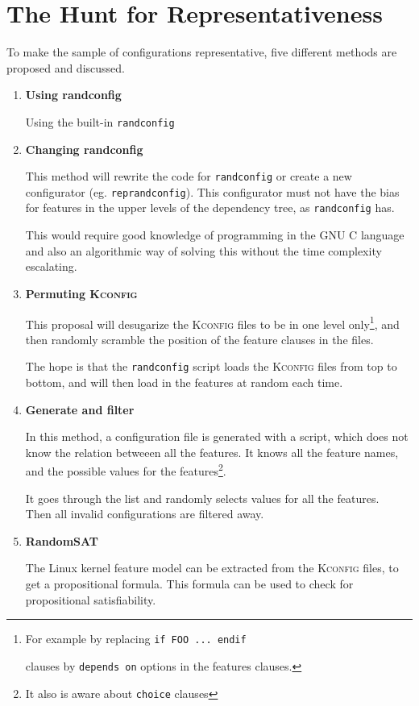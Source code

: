 \documentclass[a4paper,11pt]{report}
\newcommand{\f}{\footnote{\fn}}
\newcommand{\textcode}[1]{
    \fboxsep=1pt
    \texttt{\colorbox{gray!20}{#1}}
}
\begin{document}
        \section{The Hunt for Representativeness}
        \label{rephunt}
To make the sample of configurations representative, five different methods are
proposed and discussed.

\begin{enumerate}

    \item \textbf{Using randconfig}

Using the built-in \texttt{randconfig}

    \item \textbf{Changing randconfig}

This method will rewrite the code for \texttt{randconfig} or create a new 
configurator (eg. \texttt{reprandconfig}).  This configurator must not have the 
bias for features in the upper levels of the dependency tree, as 
\texttt{randconfig} has.

This would require good knowledge of programming in the \textsc{GNU C} language
and also an algorithmic way of solving this without the time complexity 
escalating.


    \item \textbf{Permuting \textsc{Kconfig}}

            \def \fn {For example by replacing \textcode{if FOO ... endif} 
            clauses by \textcode{depends on} options in the features clauses.}

This proposal will desugarize the \textsc{Kconfig} files to be in one level 
only\f, and then randomly scramble the position of the feature clauses in the 
files. 

The hope is that the \texttt{randconfig} script loads the \textsc{Kconfig} 
files from top to bottom, and will then load in the features at random each 
time.


    \item \textbf{Generate and filter}

            \def \fn {It also is aware about \texttt{choice} clauses}

In this method, a configuration file is generated with a script, which 
does not know the relation betweeen all the features. It knows all the feature
names, and the possible values for the features\f.

It goes through the list and randomly selects values for all the features. 
\\

Then all invalid configurations are filtered away.


    \item \textbf{RandomSAT}

The Linux kernel feature model can be extracted from the \textsc{Kconfig} 
files, to get a propositional formula\cite{lvat}. This formula can be used to 
check for propositional satisfiability.


    
\end{enumerate}
\end{document}
